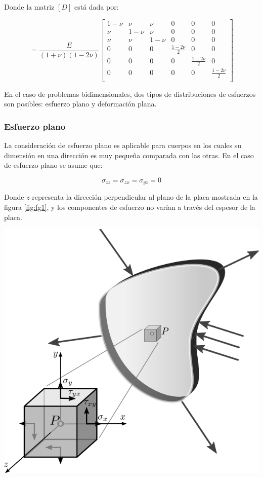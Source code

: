 Donde la matriz $[D]$ está dada por:

\begin{equation}
[C] = \frac{E}{(1+\nu)(1-2\nu)}
\left[\begin{matrix}
1-\nu & \nu & \nu & 0 & 0 & 0 \\
\nu & 1-\nu & \nu & 0 & 0 & 0 \\
\nu & \nu & 1-\nu & 0 & 0 & 0 \\
0 & 0 & 0 & \frac{1-2\nu}{2} & 0 & 0 \\
0 & 0 & 0 & 0 & \frac{1-2\nu}{2} & 0 \\
0 & 0 & 0 & 0 & 0 & \frac{1-2\nu}{2} \\
\end{matrix}\right]
\end{equation}

En el caso de problemas bidimensionales, dos tipos de distribuciones de esfuerzos son posibles: esfuerzo plano 
y deformación plana.

\subsubsection{Esfuerzo plano}

La consideración de esfuerzo plano es aplicable para cuerpos en los cuales su dimensión en una dirección es muy 
pequeña comparada con las otras. En el caso de esfuerzo plano se asume que:

\begin{equation}
\sigma_{zz} = \sigma_{zx} = \sigma_{yz} = 0
\end{equation}

Donde $z$ representa la dirección perpendicular al plano de la placa mostrada en la figura \ref{fig:fg1}, 
y los componentes de esfuerzo no varían a través del espesor de la placa.

\begin{center}
\includegraphics[scale=0.35]{src/ch2/plane_stress.png}
\label{fig:fg1}
\end{center}

